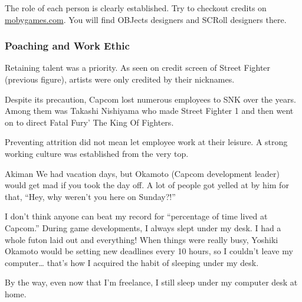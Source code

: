 
\begin{trivia}
The role of each person is clearly established. Try to checkout credits on \url{mobygames.com}. You will find OBJects designers and SCRoll designers there.
\end{trivia}


\subsubsection{Poaching and Work Ethic}
Retaining talent was a priority. As seen on credit screen of Street Fighter (previous figure), artists were only credited by their nicknames.

Despite its precaution, Capcom lost numerous employees to SNK over the years. Among them was Takashi Nishiyama who made Street Fighter 1 and then went on to direct Fatal Fury' The King Of Fighters\cite{YoshikiOkamotoTakashiNishiyama}.
 




Preventing attrition did not mean let employee work at their leisure. A strong working culture was established from the very top.

\begin{q}{Akiman\cite{akiman2003}}
  We had vacation days, but Okamoto (Capcom development leader) would get mad if you took the day off. A lot of people got yelled at by him for that, “Hey, why weren’t you here on Sunday?!”

  I don’t think anyone can beat my record for “percentage of time lived at Capcom.” During game developments, I always slept under my desk. I had a whole futon laid out and everything! When things were really busy, Yoshiki Okamoto  would be setting new deadlines every 10 hours, so I couldn’t leave my computer… that’s how I acquired the habit of sleeping under my desk. 

  By the way, even now that I’m freelance, I still sleep under my computer desk at home.
  \end{q}












